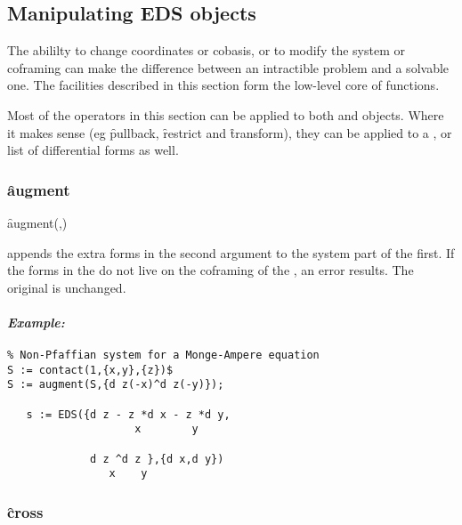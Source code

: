 
\subsection{Manipulating EDS objects}
\label{Manipulating EDS objects}

The abililty to change coordinates or cobasis, or to modify the system or
coframing can make the difference between an intractible problem and a
solvable one. The facilities described in this section form the low-level
core of  functions.

Most of the operators in this section can be applied to both  and
 objects. Where it makes sense (eg \f{pullback},
\f{restrict} and \f{transform}), they can be applied to a , or
list of differential forms as well.

\subsubsection{\f{augment}}
\label{augment}

\hypertarget{operator:AUGMENT}{}
\begin{syntax}
	\f{augment}(,)
\end{syntax}
appends the extra forms in the second argument to the system part of the
first. If the forms in the  do not live on the coframing of the
, an error results. The original  is unchanged.

\paragraph{\textit{Example:}}
\begin{verbatim}
% Non-Pfaffian system for a Monge-Ampere equation
S := contact(1,{x,y},{z})$
S := augment(S,{d z(-x)^d z(-y)});

   s := EDS({d z - z *d x - z *d y,
                    x        y

             d z ^d z },{d x,d y})
                x    y
\end{verbatim}

\subsubsection{\f{cross}}
\label{cross}

